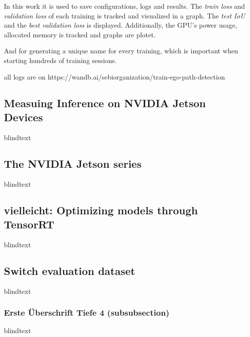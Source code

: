 

In this work it is used to save configurations, logs and results.
The \textit{train loss} and \textit{validation loss} of each training is tracked and visualized in a graph.
The \textit{test \ac{IoU}} and the \textit{best validation loss} is displayed.
Additionally, the \ac{GPU}'s power usage, allocated memory is tracked and graphs are plotet.

And for generating a unique name for every training, which is important when starting hundreds of training sessions.

all logs are on https://wandb.ai/sebiorganization/train-ego-path-detection


\subsection{Measuing Inference on NVIDIA Jetson Devices}
blindtext

\subsection{The NVIDIA Jetson series}
blindtext


\subsection{vielleicht: Optimizing models through TensorRT}
blindtext

\subsection{Switch evaluation dataset}
blindtext

\subsubsection{Erste Überschrift Tiefe 4 (subsubsection)}
blindtext
